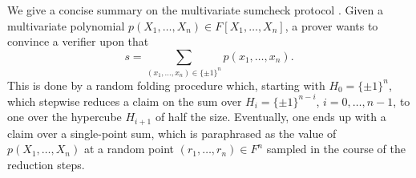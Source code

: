 \documentclass[11pt]{article}
\theoremstyle{definition}
\theoremstyle{remark}
\begin{document}
We give a concise summary on the multivariate sumcheck protocol \cite{sumcheck}.
Given a multivariate polynomial $p(X_1,\ldots, X_n)\in F[X_1,\ldots, X_n]$, a prover wants to convince a verifier upon that
\begin{equation*}
s = \sum_{(x_1,\ldots, x_n) \in \{\pm 1\}^n} p(x_1, \ldots, x_n).
\end{equation*}
This is done by a random folding procedure which, starting with $H_0=\{\pm 1\}^n$, which stepwise reduces a claim on the sum over $H_i = \{\pm 1\}^{n-i}$, $i=0,\ldots, n-1$, to one over the hypercube $H_{i+1}$ of half the size. 
Eventually, one ends up with a claim over a single-point sum, which is paraphrased as the value of $p(X_1,\ldots, X_n)$ at a random point $(r_1,\ldots, r_n)\in F^n$ sampled in the course of the reduction steps.

 
\end{document}
